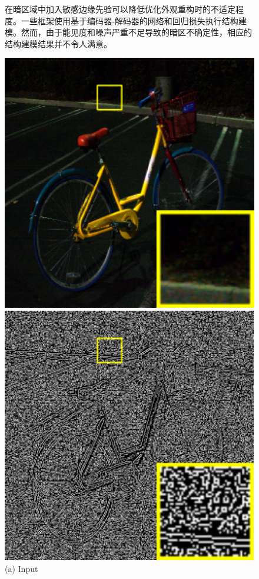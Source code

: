 \documentclass[CJK,aspectratio=169]{beamer}  %
\begin{document}
\begin{frame}
\begin{figure}
\begin{minipage}{.4\columnwidth}
\begin{itemize}
				{ \yahei 在暗区域中加入敏感边缘先验可以降低优化外观重构时的不适定程度\textcolor{blue}{\citep{xu2023low}}。一些框架\textcolor{blue}{\citep{rana2021edge}}\textcolor{blue}{\citep{zhu2020eemefn}}使用基于编码器-解码器的网络和回归损失执行结构建模。然而，由于能见度和噪声严重不足导致的暗区不确定性，相应的结构建模结果并不令人满意。}
			\end{itemize}
		\end{minipage}
		\begin{minipage}{.58\columnwidth}
			\setlength{\abovecaptionskip}{-0.05cm}
			\centering 
			\begin{minipage}{0.3\textwidth}
				\centering
				\includegraphics[width=.8\linewidth]{picture/LLIE/Structure Modeling and Guidance/Input}
				\caption*{\tiny (a) Input}
			\end{minipage}
			\begin{minipage}{.3\textwidth}
				\centering
				\includegraphics[width=.8\linewidth]{picture/LLIE/Structure Modeling and Guidance/Structure of (a)}

\end{minipage}
\end{minipage}
\end{figure}
\end{frame}
\end{document}
